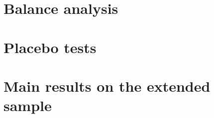 \clearpage
\section{Balance analysis}\label{app:balance}

%         

\section{Placebo tests}\label{app:placebo}

%         

\section{Main results on the extended sample}\label{app:extended}


